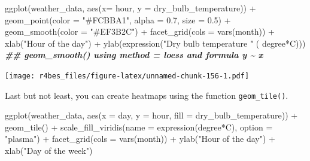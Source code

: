 \documentclass[
]{book}
\newenvironment{Shaded}{\begin{snugshade}}{\end{snugshade}}
\newcommand{\AttributeTok}[1]{\textcolor[rgb]{0.77,0.63,0.00}{#1}}
\newcommand{\DocumentationTok}[1]{\textcolor[rgb]{0.56,0.35,0.01}{\textbf{\textit{#1}}}}
\newcommand{\FloatTok}[1]{\textcolor[rgb]{0.00,0.00,0.81}{#1}}
\newcommand{\FunctionTok}[1]{\textcolor[rgb]{0.00,0.00,0.00}{#1}}
\newcommand{\NormalTok}[1]{#1}
\newcommand{\SpecialCharTok}[1]{\textcolor[rgb]{0.00,0.00,0.00}{#1}}
\newcommand{\StringTok}[1]{\textcolor[rgb]{0.31,0.60,0.02}{#1}}
\begin{document}
\begin{Shaded}
\begin{Highlighting}[]
\FunctionTok{ggplot}\NormalTok{(weather\_data, }\FunctionTok{aes}\NormalTok{(}\AttributeTok{x=}\NormalTok{ hour, }\AttributeTok{y =}\NormalTok{ dry\_bulb\_temperature)) }\SpecialCharTok{+}
    \FunctionTok{geom\_point}\NormalTok{(}\AttributeTok{color =} \StringTok{"\#FCBBA1"}\NormalTok{, }\AttributeTok{alpha =} \FloatTok{0.7}\NormalTok{, }\AttributeTok{size =} \FloatTok{0.5}\NormalTok{) }\SpecialCharTok{+}
    \FunctionTok{geom\_smooth}\NormalTok{(}\AttributeTok{color =} \StringTok{"\#EF3B2C"}\NormalTok{) }\SpecialCharTok{+}
    \FunctionTok{facet\_grid}\NormalTok{(}\AttributeTok{cols =} \FunctionTok{vars}\NormalTok{(month)) }\SpecialCharTok{+}
    \FunctionTok{xlab}\NormalTok{(}\StringTok{"Hour of the day"}\NormalTok{) }\SpecialCharTok{+}
    \FunctionTok{ylab}\NormalTok{(}\FunctionTok{expression}\NormalTok{(}\StringTok{"Dry bulb temperature "}\NormalTok{ ( degree}\SpecialCharTok{*}\NormalTok{C)))}
\DocumentationTok{\#\# \textasciigrave{}geom\_smooth()\textasciigrave{} using method = \textquotesingle{}loess\textquotesingle{} and formula \textquotesingle{}y \textasciitilde{} x\textquotesingle{}}
\end{Highlighting}
\end{Shaded}

\texttt{[image: r4bes\_files/figure-latex/unnamed-chunk-156-1.pdf]}

Last but not least, you can create heatmaps using the function \texttt{geom\_tile()}.

\begin{Shaded}
\begin{Highlighting}[]
\FunctionTok{ggplot}\NormalTok{(weather\_data, }\FunctionTok{aes}\NormalTok{(}\AttributeTok{x =}\NormalTok{ day, }\AttributeTok{y =}\NormalTok{ hour, }\AttributeTok{fill =}\NormalTok{ dry\_bulb\_temperature)) }\SpecialCharTok{+}
    \FunctionTok{geom\_tile}\NormalTok{() }\SpecialCharTok{+}
    \FunctionTok{scale\_fill\_viridis}\NormalTok{(}\AttributeTok{name =} \FunctionTok{expression}\NormalTok{(degree}\SpecialCharTok{*}\NormalTok{C),}
                       \AttributeTok{option =} \StringTok{"plasma"}\NormalTok{) }\SpecialCharTok{+}
    \FunctionTok{facet\_grid}\NormalTok{(}\AttributeTok{cols =} \FunctionTok{vars}\NormalTok{(month)) }\SpecialCharTok{+}
    \FunctionTok{ylab}\NormalTok{(}\StringTok{"Hour of the day"}\NormalTok{) }\SpecialCharTok{+}
    \FunctionTok{xlab}\NormalTok{(}\StringTok{"Day of the week"}\NormalTok{) }
\end{Highlighting}
\end{Shaded}
\end{document}
